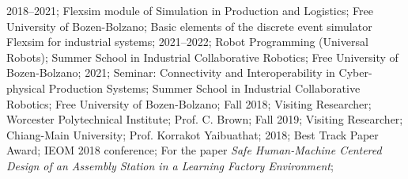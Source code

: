 \addteaching%
{%
    2018--2021;%
    Flexsim module of Simulation in Production and Logistics;%
    Free University of Bozen-Bolzano;%
    Basic elements of the discrete event simulator Flexsim for industrial systems;%
}%
\addteaching%
{%
    2021--2022;%
    Robot Programming (Universal Robots);%
    Summer School in Industrial Collaborative Robotics;%
    Free University of Bozen-Bolzano;%
}%
\addteaching%
{%
    2021;%
    Seminar: Connectivity and Interoperability in Cyber-physical Production Systems;
    Summer School in Industrial Collaborative Robotics;%
    Free University of Bozen-Bolzano;%
}%
\addvisit%
{%
    Fall 2018;%
    Visiting Researcher;%
    Worcester Polytechnical Institute;%
    Prof\@. C\@. Brown;%
}%
\addvisit%
{%
    Fall 2019;%
    Visiting Researcher;%
    Chiang-Main University;%
    Prof\@. Korrakot Yaibuathat;%
}%
\addhonour%
{%
    2018;%
    Best Track Paper Award;%
    IEOM 2018 conference;%
    For the paper \emph{Safe Human-Machine Centered Design of an Assembly Station in a Learning Factory Environment};%
}%
